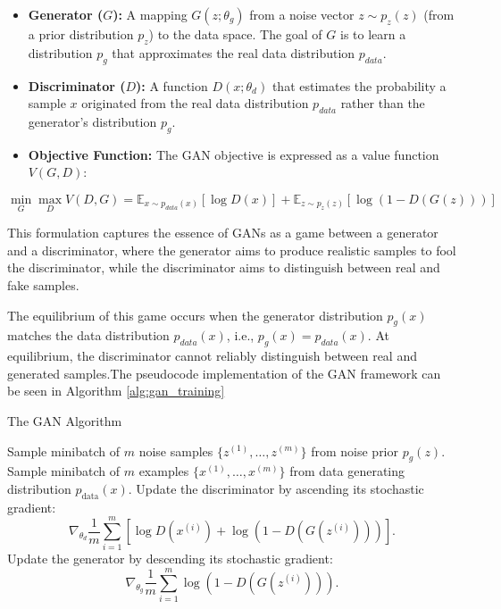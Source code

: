 \documentclass[12pt]{report}
\begin{document}
\begin{itemize}
    \item \textbf{Generator ($G$):} A mapping \( G(z; \theta_g)\) from a  noise vector $z \sim p_z(z)$ (from a prior distribution $p_z$) to the data space. The goal of $G$ is to learn a distribution $p_g$ that approximates the real data distribution $p_{data}$.
    
    \item \textbf{Discriminator ($D$):} A function \( D(x; \theta_d)\) that estimates the probability a sample $x$ originated from the real data distribution $p_{data}$ rather than the generator's distribution $p_g$.

    \item \textbf{Objective Function:} The GAN objective is expressed as a value function $V(G,D)$:
\end{itemize}

\begin{equation*}
\min_G \max_D V(D, G) = \mathbb{E}_{x \sim p_{data}(x)}[\log D(x)] + \mathbb{E}_{z \sim p_z(z)}[\log(1 - D(G(z)))]
\end{equation*}

This formulation captures the essence of GANs as a game between a generator and a discriminator, where the generator aims to produce realistic samples to fool the discriminator, while the discriminator aims to distinguish between real and fake samples.

The equilibrium of this game occurs when the generator distribution $p_g(x)$ matches the data distribution $p_{data}(x)$, i.e., $p_g(x) = p_{data}(x)$. At equilibrium, the discriminator cannot reliably distinguish between real and generated samples.The pseudocode implementation of the GAN framework can be seen in Algorithm \ref{alg:gan_training}

\begin{algorithm}
\caption{The GAN Algorithm}
\label{alg:gan_training}
\begin{algorithmic}
    \STATE Sample minibatch of \(m\) noise samples \(\{z^{(1)}, \ldots, z^{(m)}\}\) from noise prior \(p_g(z)\).
    \STATE Sample minibatch of \(m\) examples \(\{x^{(1)}, \ldots, x^{(m)}\}\) from data generating distribution \(p_{\text{data}}(x)\).
    \STATE Update the discriminator by ascending its stochastic gradient:
    \[
    \nabla_{\theta_d} \frac{1}{m} \sum_{i=1}^m \left[ \log D(x^{(i)}) + \log (1 - D(G(z^{(i)}))) \right].
    \]
    \STATE Update the generator by descending its stochastic gradient:
    \[
    \nabla_{\theta_g} \frac{1}{m} \sum_{i=1}^m \log (1 - D(G(z^{(i)}))).
    \]
\ENDFOR
\end{algorithmic}
\end{algorithm}
\end{document}
